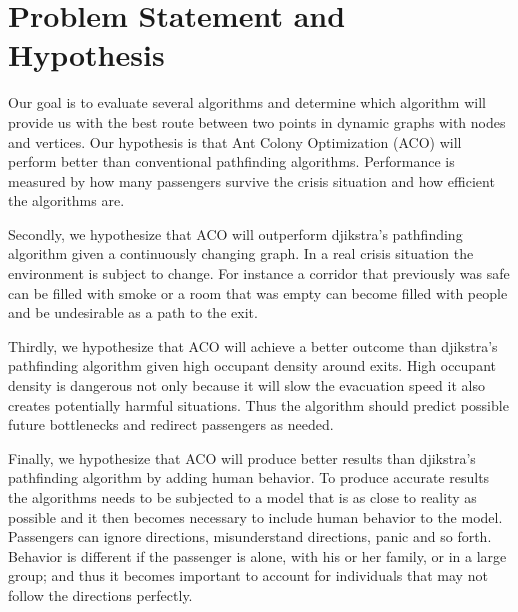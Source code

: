 \chapter{Problem Statement and Hypothesis}
\label{ch:problem}


Our goal is to evaluate several algorithms and determine which algorithm will provide us with the
best route between two points in dynamic graphs with nodes and vertices. Our hypothesis
is that Ant Colony Optimization (ACO) will perform better than conventional pathfinding
algorithms. Performance is measured by how many passengers survive the crisis situation
and how efficient the algorithms are. 

Secondly, we hypothesize that ACO will outperform djikstra's pathfinding algorithm
given a continuously changing graph. In a real crisis situation the environment is subject
to change. For instance a corridor that previously was safe can be filled with smoke
or a room that was empty can become filled with people and be undesirable as a path
to the exit.

Thirdly, we hypothesize that ACO will achieve a better outcome than djikstra's pathfinding algorithm
given high occupant density around exits. High occupant density is dangerous not only
because it will slow the evacuation speed it also creates potentially harmful situations. Thus the algorithm
should predict possible future bottlenecks and redirect passengers as needed.

Finally, we hypothesize that ACO will produce better results than djikstra's pathfinding algorithm
by adding human behavior. To produce accurate results the algorithms needs to be subjected
to a model that is as close to reality as possible and it then becomes necessary to include
human behavior to the model. Passengers can ignore directions, misunderstand directions, panic
and so forth. Behavior is different if the passenger is alone, with his or her family, or in a large group;
and thus it becomes important to account for individuals that may not follow the directions perfectly.

